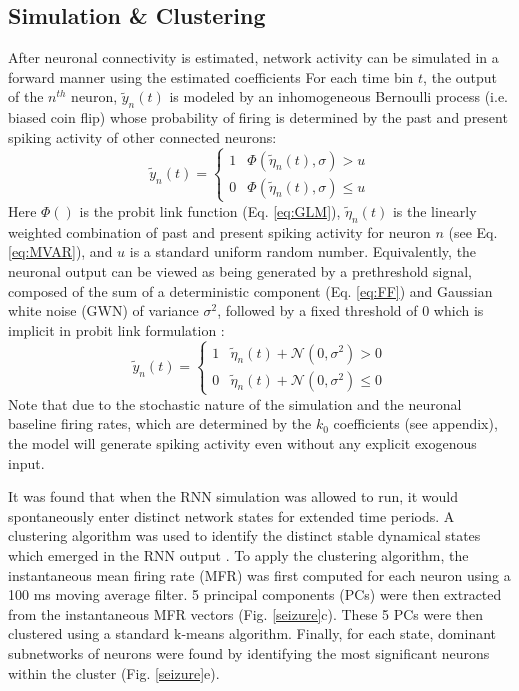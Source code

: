 \documentclass[11pt,a4paper,final]{article}
\begin{document}
\subsection{Simulation \& Clustering}
After neuronal connectivity is estimated, network activity can be simulated in a forward manner using the estimated coefficients 
For each time bin $t$, the output of the $n^{th}$ neuron, $\tilde{y}_n(t)$ is modeled by an inhomogeneous Bernoulli process (i.e. biased coin flip) whose probability of firing is determined by the past and present spiking activity of other connected neurons: 
\begin{equation}
\tilde{y}_n(t) =
\begin{cases}
1   & \Phi(\tilde{\eta}_n(t),\sigma) > u        \\
0   & \Phi(\tilde{\eta}_n(t),\sigma) \leq u
\end{cases}
\label{eq:simul}
\end{equation}
Here $\Phi()$ is the probit link function (Eq. \ref{eq:GLM}), $\tilde{\eta}_n(t)$ is the linearly weighted combination of past and present spiking activity for neuron $n$ (see Eq. \ref{eq:MVAR}), and $u$ is a standard uniform random number.
Equivalently, the neuronal output can be viewed as being generated by a prethreshold signal, composed of the sum of a deterministic component (Eq. \ref{eq:FF}) and Gaussian white noise (GWN) of variance $\sigma^2$, followed by a fixed threshold of 0 which is implicit in probit link formulation \citep{berger12}:
\begin{equation}
\tilde{y}_n(t) =
\begin{cases}
1   & \tilde{\eta}_n(t) + \mathcal{N}(0,\sigma^2) > 0        \\
0   & \tilde{\eta}_n(t) + \mathcal{N}(0,\sigma^2) \leq 0
\end{cases}
\label{eq:simul2}
\end{equation}
Note that due to the stochastic nature of the simulation and the neuronal baseline firing rates, which are determined by the $k_0$ coefficients (see appendix), the model will generate spiking activity even without any explicit exogenous input. 

It was found that when the RNN simulation was allowed to run, it would spontaneously enter distinct network states for extended time periods.
A clustering algorithm was used to identify the distinct stable dynamical states which emerged in the RNN output \citep{sasaki07,santaniello14}.
To apply the clustering algorithm, the instantaneous mean firing rate (MFR) was first computed for each neuron using a 100 ms moving average filter.
5 principal components (PCs) were then extracted from the \nn{} instantaneous MFR vectors (Fig. \ref{seizure}c).
These 5 PCs were then clustered using a standard k-means algorithm.
Finally, for each state, dominant subnetworks of neurons were found by identifying the most significant neurons within the cluster (Fig. \ref{seizure}e).
\end{document}
